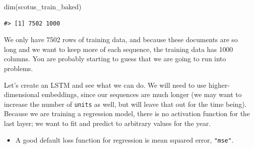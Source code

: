 \documentclass[
]{krantz}
\makeatletter
\newenvironment{Shaded}{\begin{snugshade}}{\end{snugshade}}
\newcommand{\AttributeTok}[1]{\textcolor[rgb]{0.77,0.63,0.00}{#1}}
\newcommand{\ConstantTok}[1]{\textcolor[rgb]{0.00,0.00,0.00}{#1}}
\newcommand{\DecValTok}[1]{\textcolor[rgb]{0.00,0.00,0.81}{#1}}
\newcommand{\FloatTok}[1]{\textcolor[rgb]{0.00,0.00,0.81}{#1}}
\newcommand{\FunctionTok}[1]{\textcolor[rgb]{0.00,0.00,0.00}{#1}}
\newcommand{\NormalTok}[1]{#1}
\newcommand{\OtherTok}[1]{\textcolor[rgb]{0.56,0.35,0.01}{#1}}
\newcommand{\SpecialCharTok}[1]{\textcolor[rgb]{0.00,0.00,0.00}{#1}}
\newcommand{\StringTok}[1]{\textcolor[rgb]{0.31,0.60,0.02}{#1}}
\newenvironment{kframe}{%
\medskip{}
\setlength{\fboxsep}{.8em}
 \def\at@end@of@kframe{}%
 \ifinner\ifhmode%
  \def\at@end@of@kframe{\end{minipage}}%
  \begin{minipage}{\columnwidth}%
 \fi\fi%
 \def\FrameCommand##1{\hskip\@totalleftmargin \hskip-\fboxsep
 \colorbox{shadecolor}{##1}\hskip-\fboxsep
     \hskip-\linewidth \hskip-\@totalleftmargin \hskip\columnwidth}%
 \MakeFramed {\advance\hsize-\width
   \@totalleftmargin\z@ \linewidth\hsize
   \@setminipage}}%
 {\par\unskip\endMakeFramed%
 \at@end@of@kframe}
\renewenvironment{Shaded}{\begin{kframe}}{\end{kframe}}
\newenvironment{rmdblock}[1]
  {\begin{shaded*}
  \begin{itemize}[left = -1cm, labelsep = 1cm]
  \renewcommand{\labelitemi}{
    \raisebox{-.7\height}[0pt][0pt]{
      {\setkeys{Gin}{width=3em,keepaspectratio}\texttt{[image: images/\#1]}}
    }
  }
 
  \item
  }
  {
  \end{itemize}
  \end{shaded*}
  }
\newenvironment{rmdnote}
  {\begin{rmdblock}{note}}
  {\end{rmdblock}}
\makeatother
\begin{document}
\begin{Shaded}
\begin{Highlighting}[]
\FunctionTok{dim}\NormalTok{(scotus\_train\_baked)}
\end{Highlighting}
\end{Shaded}

\begin{verbatim}
#> [1] 7502 1000
\end{verbatim}

We only have 7502 rows of training data, and because these documents are so long and we want to keep more of each sequence, the training data has 1000 columns. You are probably starting to guess that we are going to run into problems.

Let's create an LSTM and see what we can do. We will need to use higher-dimensional embeddings, since our sequences are much longer (we may want to increase the number of \texttt{units} as well, but will leave that out for the time being). Because we are training a regression model, there is no activation function for the last layer; we want to fit and predict to arbitrary values for the year.

\begin{rmdnote}
A good default loss function for regression is mean squared error,
\texttt{"mse"}.
\end{rmdnote}

\begin{Shaded}
\end{Shaded}
\end{document}
